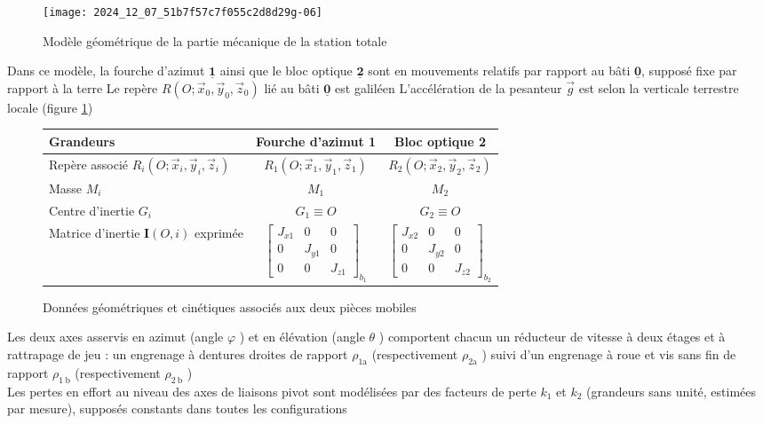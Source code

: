 \begin{figure}[!h]
\centering
\texttt{[image: 2024\_12\_07\_51b7f57c7f055c2d8d29g-06]}

\caption{Modèle géométrique de la partie mécanique de la station totale \label{CCS_MP_2017:fig_09}}
\end{figure}

Dans ce modèle, la fourche d'azimut $\underline{\mathbf{1}}$ ainsi que le bloc optique $\underline{\mathbf{2}}$ sont en mouvements relatifs par rapport au bâti $\underline{\mathbf{0}}$, supposé fixe par rapport à la terre Le repère $R\left(O ; \vec{x}_{0}, \vec{y}_{0}, \vec{z}_{0}\right)$ lié au bâti $\underline{\mathbf{0}}$ est galiléen L'accélération de la pesanteur $\vec{g}$ est selon la verticale terrestre locale (figure \ref{CCS_MP_2017:fig_09})

\begin{figure}[!h]
\centering
\begin{tabular}{lcc}
\hline
\textbf{Grandeurs} & \textbf{Fourche d'azimut 1} & \textbf{Bloc optique 2} \\
\hline
Repère associé $R_{i}\left(O ; \vec{x}_{i}, \vec{y}_{i}, \vec{z}_{i}\right)$ & $R_{1}\left(O ; \vec{x}_{1}, \vec{y}_{1}, \vec{z}_{1}\right)$ & $R_{2}\left(O ; \vec{x}_{2}, \vec{y}_{2}, \vec{z}_{2}\right)$ \\
Masse $M_{i}$ & $M_{1}$ & $M_{2}$ \\
Centre d'inertie $G_{i}$ & $G_{1} \equiv O$ & $G_{2} \equiv O$ \\
Matrice d'inertie $\mathbf{I}(O, i)$ exprimée & $\left[\begin{array}{ccc}J_{x 1} & 0 & 0 \\ 0 & J_{y 1} & 0 \\ 0 & 0 & J_{z 1}\end{array}\right]_{b_{1}}$ & $\left[\begin{array}{ccc}J_{x 2} & 0 & 0 \\ 0 & J_{y 2} & 0 \\ 0 & 0 & J_{z 2}\end{array}\right]_{b_{2}}$ \\
\hline
\end{tabular}
\caption{Données géométriques et cinétiques associés aux deux pièces mobiles \label{CCS_MP_2017:fig_10}}
\end{figure}


Les deux axes asservis en azimut (angle $\varphi$ ) et en élévation (angle $\theta$ ) comportent chacun un réducteur de vitesse à deux étages et à rattrapage de jeu : un engrenage à dentures droites de rapport $\rho_{1 \mathrm{a}}$ (respectivement $\rho_{2 \mathrm{a}}$ ) suivi d'un engrenage à roue et vis sans fin de rapport $\rho_{1 \mathrm{~b}}$ (respectivement $\rho_{2 \mathrm{~b}}$ )\\
Les pertes en effort au niveau des axes de liaisons pivot sont modélisées par des facteurs de perte $k_{1}$ et $k_{2}$ (grandeurs sans unité, estimées par mesure), supposés constants dans toutes les configurations

